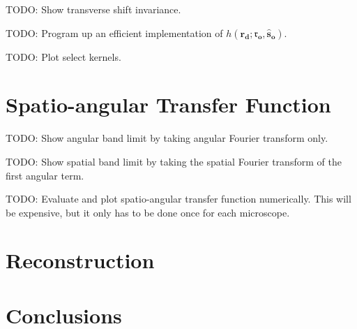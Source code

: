 \documentclass[11pt]{article}
\providecommand{\ro}[1]{\mathbf{\mathfrak{r}_o}}
\providecommand{\so}[1]{\mathbf{\hat{s}_o}}
\providecommand{\rd}[1]{\mathbf{r_d}}
\begin{document}
TODO: Show transverse shift invariance. 

TODO: Program up an efficient implementation of $h(\rd{}; \ro{}, \so{})$.

TODO: Plot select kernels.

\section{Spatio-angular Transfer Function}

TODO: Show angular band limit by taking angular Fourier transform only.

TODO: Show spatial band limit by taking the spatial Fourier transform of the
first angular term.

TODO: Evaluate and plot spatio-angular transfer function numerically. This
will be expensive, but it only has to be done once for each microscope. 

\section{Reconstruction}

\section{Conclusions}
\end{document}
